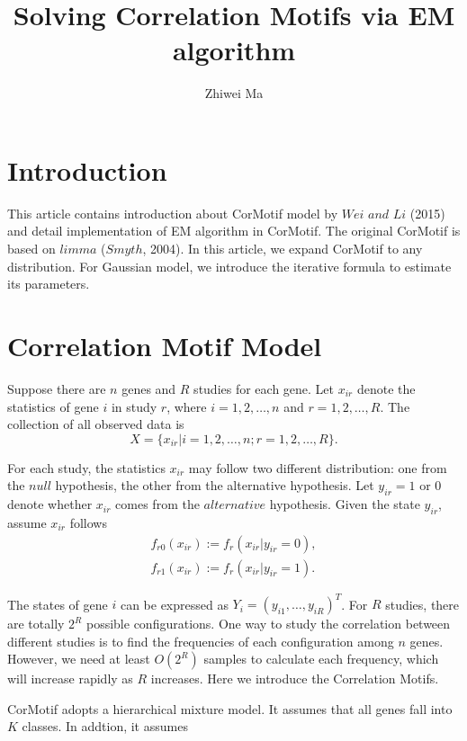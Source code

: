 \documentclass[11pt, oneside]{article}   	%
\title{Solving Correlation Motifs via EM algorithm}
\author{Zhiwei Ma}
\begin{document}
\maketitle
\section{Introduction}

This article contains introduction about CorMotif model by $Wei$ $and$ $Li$ (2015) and detail implementation of EM algorithm in CorMotif. The original CorMotif is based on $limma$ ($Smyth$, 2004). In this article, we expand CorMotif to any distribution. For Gaussian model, we introduce the iterative formula to estimate its parameters. 

\section{Correlation Motif Model}

Suppose there are $n$ genes and $R$ studies for each gene. Let $x_{ir}$ denote the statistics of gene $i$ in study $r$, where $i=1,2,\ldots,n$ and $r = 1,2,\ldots,R$. The collection of all observed data is 
$$X=\{x_{ir}| i=1,2,\ldots,n; r = 1,2,\ldots,R\}.$$

For each study, the statistics $x_{ir}$ may follow two different distribution: one from the $null$ hypothesis, the other from the alternative hypothesis. Let $y_{ir}=1$ or $0$ denote whether $x_{ir}$ comes from the $alternative$ hypothesis. Given the state $y_{ir}$, assume $x_{ir}$ follows
\begin{eqnarray}
\label{eq:1}
f_{r0}(x_{ir}):=f_r(x_{ir}|y_{ir}=0),    \\ 
f_{r1}(x_{ir}):=f_r(x_{ir}|y_{ir}=1).
\label{eq:2}
\end{eqnarray}

The states of gene $i$ can be expressed as $Y_i = (y_{i1},\ldots,y_{iR})^T$. For $R$ studies, there are totally $2^R$ possible configurations. One way to study the correlation between different studies is to find the frequencies of each configuration among $n$ genes. However, we need at least $O(2^R)$ samples to calculate each frequency, which will increase rapidly as $R$ increases. Here we introduce the Correlation Motifs.

CorMotif adopts a hierarchical mixture model. It assumes that all genes fall into $K$ classes. In addtion, it assumes
\end{document}
